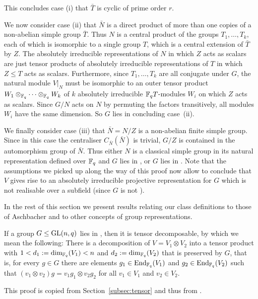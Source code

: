 This concludes case (i) that $\bar T$ is cyclic of prime order $r$.

We now consider case (ii) that $\bar N$ is a direct product of more than
one copies of a non-abelian simple group $\bar T$. Thus $N$ is a
central product of the groups $T_1, \ldots, T_k$, each of which is
isomorphic to a single group $T$, which is a central extension of
$\bar T$ by $Z$. The absolutely irreducible representations
of $N$ in which $Z$ acts as scalars are just tensor products of 
absolutely irreducible representations of $T$ in which $Z \le T$ acts as
scalars. Furthermore, since $T_1, \ldots, T_k$ are all conjugate under
$G$, the natural module $V|_N$ must be isomorphic to an outer tensor product
$W_1 \otimes_{\mathbb{F}_q} \cdots \otimes_{\mathbb{F}_q} W_k$ 
of $k$ absolutely irreducible $\mathbb{F}_q T$-modules $W_i$ on which $Z$
acts as scalars. Since $G/N$ acts on $N$ by permuting the factors
transitively, all modules $W_i$ have the same dimension. So $G$ lies in
 concluding case~(ii).

We finally consider case (iii) that $\bar N = N/Z$ is a non-abelian finite 
simple group. Since in this case the centraliser $C_{\bar N}(\bar N)$ is 
trivial, $G/Z$ is contained in the automorphism group of $\bar N$. 
Thus either $N$ is a classical simple group in its natural
representation defined over $\mathbb{F}_q$ and
$G$ lies in , or $G$ lies in . Note that the assumptions we
picked up along the way of this proof now allow to conclude that $V$
gives rise to an absolutely irreducible projective representation for
$G$ which is not realisable over a subfield (since $G$ is not ).
\proofend

\medskip
In the rest of this section we present results relating our class
definitions to those of Aschbacher and to other concepts of group
representations.

\begin{Prop}
    \label{tensorprop}
If a group $G \le \GL(n,q)$ lies in , then it is tensor decomposable,
by which we mean the following:
There is a decomposition
of\/ $V = V_1 \otimes V_2$ into a tensor product with 
$1 < d_1 := \dim_{\mathbb{F}_q}(V_1) < n$
and $d_2 := \dim_{\mathbb{F}_q}(V_2)$ that is preserved by $G$, 
that is, for every $g \in
G$ there are elements $g_1 \in \End_{\F_q}(V_1)$ and $g_2 \in
\End_{\F_q}(V_2)$ such that $(v_1 \otimes v_2) g = v_1 g_1 \otimes v_2 g_2$
for all $v_1 \in V_1$ and $v_2 \in V_2$.
\end{Prop}
\proofbeg
This proof is copied from Section~\ref{subsec:tensor} and thus from 
\cite[Section~6.6]{subfieldpaper}.

